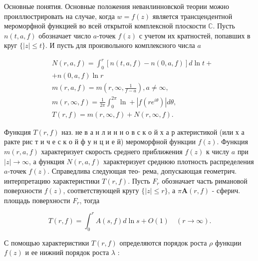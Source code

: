\documentclass[10pt]{article}
\begin{document}
Основные понятия. Основные положения неванлинновской теории можно проиллюстрировать на случае, когда $w=f(z)$ является трансцендентной мероморфной функцией во всей открытой комплексной плоскости $\mathbb{C}$. Пусть $n(t, a, f)$ обозначает число $a$-точек $f(z)$ с учетом их кратностей, попавших в круг $\{|z| \leqslant t\}$. И пусть для произвольного комплексного числа $a$



\[

\begin{aligned}

& N(r, a, f)=\int_{0}^{r}[n(t, a, f)-n(0, a, f)] d \ln t+ \\

& +n(0, a, f) \ln r \\

& m(r, a, f)=m\left(r, \infty, \frac{1}{f-a}\right), a \neq \infty \text {, } \\

& m(r, \infty, f)=\frac{1}{2 \pi} \int_{0}^{2 \pi} \ln +\left|f\left(r e^{i \theta}\right)\right| d \theta, \\

& T(r, f)=m(r, \infty, f)+N(r, \infty, f) .

\end{aligned}

\]



Функция $T(r, f)$ наз. не в а н л и н н о в с к о й х а р актеристикой (или х а ракте рис т и ч е с к о й ф у н ц и е й) мероморфной функции $f(z)$. Функция $m(r, a, f)$ характеризует скорость среднего приближения $f(z)$ к числу $a$ при $|z| \rightarrow \infty$, а функция $N(r, a, f)$ характеризует среднюю плотность распределения $a$-точек $f(z)$. Справедлива следующая тео- рема, допускающая геометрич. интерпретацию характеристики $T(r, f)$. Пусть $F_{r}$ обозначает часть римановой поверхности $f(z)$, соответствующей кругу $\{|z| \leqslant r\}$, а $\pi \boldsymbol{A}(r, f)$ - сферич. площадь поверхности $F_{r}$, тогда



\[

T(r, f)=\int_{0}^{r} A(s, f) d \ln s+O(1) \quad(r \longrightarrow \infty) .

\]



С помощью характеристики $T(r, f)$ определяются порядок роста $\rho$ функции $f(z)$ и ее нижний порядок роста $\lambda$ :
\end{document}

